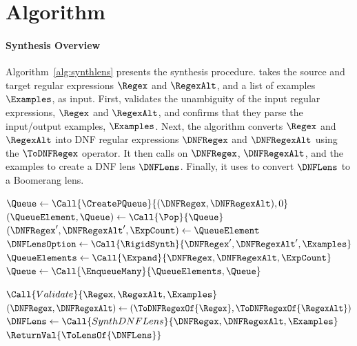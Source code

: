 \documentclass[sigplan,acmsmall]{acmart}
\begin{document}
\section{Algorithm}
\label{algorithm}

\paragraph*{Synthesis Overview}
Algorithm~\ref{alg:synthlens} presents the synthesis procedure.
\SynthLens{} takes the source and target regular
expressions $\Regex$ and $\RegexAlt$, and a list of examples $\Examples$, as
input. First, \SynthLens{} validates the unambiguity of the input regular
expressions, $\Regex$ and $\RegexAlt$, and confirms that they parse the
input/output examples, $\Examples$. Next, the algorithm converts
$\Regex$ and $\RegexAlt$ into DNF regular expressions
$\DNFRegex$ and $\DNFRegexAlt$
using the $\ToDNFRegex$ operator.
It then calls \SynthDNFLens{}
on $\DNFRegex$, $\DNFRegexAlt$, and the examples
to create a DNF lens $\DNFLens$.  
Finally, it uses \ToLens{} to convert $\DNFLens$ to a Boomerang lens.


\begin{algorithm}
  \caption{\SynthLens}
  \label{alg:synthlens}
  \begin{algorithmic}[1]
    \State $\Queue \gets \Call{\CreatePQueue}{(\DNFRegex,\DNFRegexAlt),0}$
    \While{$\True$}
    \State $(\QueueElement,\Queue) \gets \Call{\Pop}{\Queue}$
    \State $(\DNFRegex',\DNFRegexAlt',\ExpCount) \gets \QueueElement$
    \State $\DNFLensOption \gets
    \Call{\RigidSynth}{\DNFRegex',\DNFRegexAlt',\Examples}$
    \Switch{\DNFLensOption}
    \CaseTwo {\SomeOf{\DNFLens}}{\ReturnVal{\DNFLens}}
    \EndCaseTwo
    \Case {\None}
    \State $\QueueElements \gets \Call{\Expand}{\DNFRegex,\DNFRegexAlt,\ExpCount}$
    \State $\Queue \gets \Call{\EnqueueMany}{\QueueElements,\Queue}$
    \EndCase
    \EndSwitch
    \EndWhile
    \EndFunction
    
    \Statex
    \State $\Call{Validate}{\Regex,\RegexAlt,\Examples}$
    \State $(\DNFRegex,\DNFRegexAlt) \gets
    (\ToDNFRegexOf{\Regex},\ToDNFRegexOf{\RegexAlt})$
    \State $\DNFLens \gets \Call{SynthDNFLens}{\DNFRegex,\DNFRegexAlt,\Examples}$
    \State $\ReturnVal{\ToLensOf{\DNFLens}}$
    \EndFunction
  \end{algorithmic}
\end{algorithm}
\end{document}
